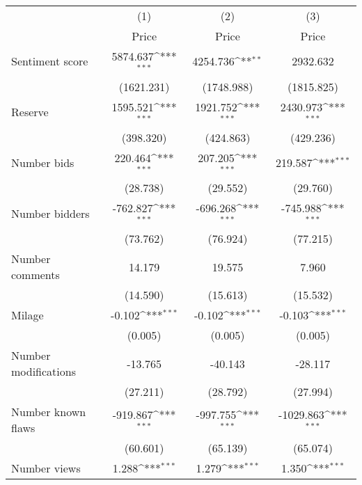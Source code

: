 {
\def\sym#1{\ifmmode^{#1}\else\(^{#1}\)\fi}
\begin{tabular}{l*{3}{c}}
\hline\hline
                    &\multicolumn{1}{c}{(1)}&\multicolumn{1}{c}{(2)}&\multicolumn{1}{c}{(3)}\\
                    &\multicolumn{1}{c}{Price}&\multicolumn{1}{c}{Price}&\multicolumn{1}{c}{Price}\\
\hline
Sentiment score     &    5874.637\sym{***}&    4254.736\sym{**} &    2932.632         \\
                    &  (1621.231)         &  (1748.988)         &  (1815.825)         \\
[1em]
Reserve             &    1595.521\sym{***}&    1921.752\sym{***}&    2430.973\sym{***}\\
                    &   (398.320)         &   (424.863)         &   (429.236)         \\
[1em]
Number bids         &     220.464\sym{***}&     207.205\sym{***}&     219.587\sym{***}\\
                    &    (28.738)         &    (29.552)         &    (29.760)         \\
[1em]
Number bidders      &    -762.827\sym{***}&    -696.268\sym{***}&    -745.988\sym{***}\\
                    &    (73.762)         &    (76.924)         &    (77.215)         \\
[1em]
Number comments     &      14.179         &      19.575         &       7.960         \\
                    &    (14.590)         &    (15.613)         &    (15.532)         \\
[1em]
Milage              &      -0.102\sym{***}&      -0.102\sym{***}&      -0.103\sym{***}\\
                    &     (0.005)         &     (0.005)         &     (0.005)         \\
[1em]
Number modifications&     -13.765         &     -40.143         &     -28.117         \\
                    &    (27.211)         &    (28.792)         &    (27.994)         \\
[1em]
Number known flaws  &    -919.867\sym{***}&    -997.755\sym{***}&   -1029.863\sym{***}\\
                    &    (60.601)         &    (65.139)         &    (65.074)         \\
[1em]
Number views        &       1.288\sym{***}&       1.279\sym{***}&       1.350\sym{***}\\

\end{tabular}}
